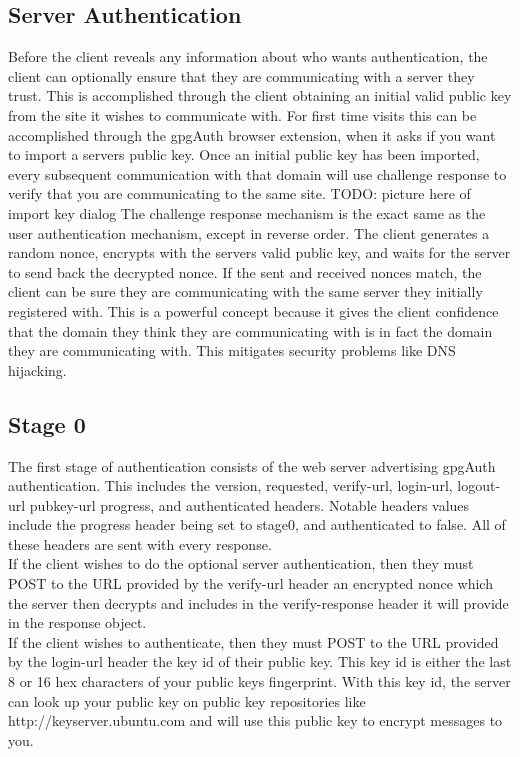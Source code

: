 \documentclass[11pt]{article}
\begin{document}
\subsection{Server Authentication} \label{subsec:serverAuth}
Before the client reveals any information about who wants authentication, the client can optionally ensure that they are communicating with a server they trust. This is accomplished through the client obtaining an initial valid public key from the site it wishes to communicate with. For first time visits this can be accomplished through the gpgAuth browser extension, when it asks if you want to import a servers public key. Once an initial public key has been imported, every subsequent communication with that domain will use challenge response to verify that you are communicating to the same site.
TODO: picture here of import key dialog
The challenge response mechanism is the exact same as the user authentication mechanism, except in reverse order. The client generates a random nonce, encrypts with the servers valid public key, and waits for the server to send back the decrypted nonce. If the sent and received nonces match, the client can be sure they are communicating with the same server they initially registered with.
This is a powerful concept because it gives the client confidence that the domain they think they are communicating with is in fact the domain they are communicating with. This mitigates security problems like DNS hijacking.

\subsection{Stage 0} \label{subsec:stage0}
The first stage of authentication consists of the web server advertising gpgAuth authentication. This includes the version, requested, verify-url, login-url, logout-url pubkey-url progress, and authenticated headers. Notable headers values include the progress header being set to stage0, and authenticated to false. All of these headers are sent with every response. \\
If the client wishes to do the optional server authentication, then they must POST to the URL provided by the verify-url header an encrypted nonce which the server then decrypts and includes in the verify-response header it will provide in the response object. \\
If the client wishes to authenticate, then they must POST to the URL provided by the login-url header the key id of their public key. This key id is either the last 8 or 16 hex characters of your public keys fingerprint. With this key id, the server can look up your public key on public key repositories like http://keyserver.ubuntu.com and will use this public key to encrypt messages to you. \\
\end{document}
